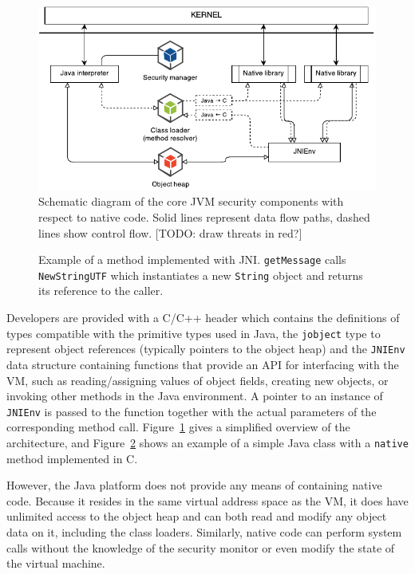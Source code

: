 \documentclass[a4paper,12pt,twoside,openright]{report}
\begin{document}
\begin{figure}
	\includegraphics[width=\textwidth]{dia_jni_orig.pdf}
	\caption{Schematic diagram of the core JVM security components with respect to native code. Solid lines represent data flow paths, dashed lines show control flow. [TODO: draw threats in red?]}
	\label{fig:OverviewJNI}
\end{figure}

\begin{figure}[t]
	
	
	\caption{Example of a method implemented with JNI. \texttt{getMessage} calls \texttt{NewStringUTF} which instantiates a new \texttt{String} object and returns its reference to the caller.}
	\label{listing:HelloJNI}
\end{figure}

Developers are provided with a C/C++ header which contains the definitions of types compatible with the primitive types used in Java, the \texttt{jobject} type to represent object references (typically pointers to the object heap) and the \texttt{JNIEnv} data structure containing functions that provide an API for interfacing with the VM, such as reading/assigning values of object fields, creating new objects, or invoking other methods in the Java environment. A pointer to an instance of \texttt{JNIEnv} is passed to the function together with the actual parameters of the corresponding method call. Figure~\ref{fig:OverviewJNI} gives a simplified overview of the architecture, and Figure~\ref{listing:HelloJNI} shows an example of a simple Java class with a \texttt{native} method implemented in C.

However, the Java platform does not provide any means of containing native code. Because it resides in the same virtual address space as the VM, it does have unlimited access to the object heap and can both read and modify any object data on it, including the class loaders. Similarly, native code can perform system calls without the knowledge of the security monitor or even modify the state of the virtual machine.
\end{document}
